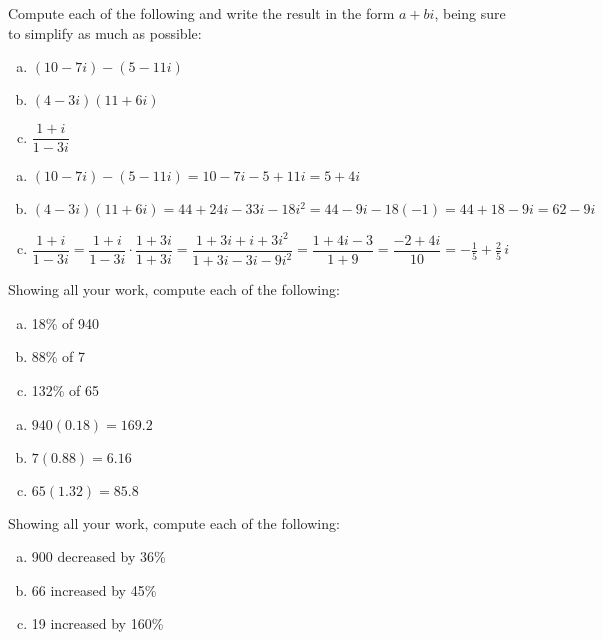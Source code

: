 \documentclass[12pt,letterpaper]{exam}
\begin{document}
\begin{questions}
\newpage
\question[10] Compute each of the following and write the result in the form $a + bi$, being sure to simplify as much as possible:
	\begin{enumerate}[(a)]
	\item $(10 - 7i) - (5 - 11i)$
	\item $(4 - 3i)(11 + 6i)$
	\item $\dfrac{1 + i}{1 - 3i}$
	\end{enumerate} \pspace

\sol
\begin{enumerate}[(a)]
\item $(10 - 7i) - (5 - 11i)= 10 - 7i - 5 + 11i= 5 + 4i$ \pspace

\item $(4 - 3i)(11 + 6i)= 44 + 24i - 33i - 18i^2= 44 - 9i - 18(-1)= 44 + 18 - 9i= 62 - 9i$ \pspace

\item $\dfrac{1 + i}{1 - 3i}= \dfrac{1 + i}{1 - 3i} \cdot \dfrac{1 + 3i}{1 + 3i}= \dfrac{1 + 3i + i + 3i^2}{1 + 3i - 3i - 9i^2}= \dfrac{1 + 4i - 3}{1 + 9}= \dfrac{-2 + 4i}{10}= -\tfrac{1}{5} + \tfrac{2}{5}\,i$
\end{enumerate}



\newpage
\question[10] Showing all your work, compute each of the following:
	\begin{enumerate}[(a)]
	\item 18\% of 940
	\item 88\% of 7
	\item 132\% of 65
	\end{enumerate} \pspace

\sol
\begin{enumerate}[(a)]
\item $940(0.18)= 169.2$ \pspace

\item $7(0.88)= 6.16$ \pspace

\item $65(1.32)= 85.8$ 
\end{enumerate}



\newpage
\question[10] Showing all your work, compute each of the following:
	\begin{enumerate}[(a)]
	\item 900 decreased by 36\%
	\item 66 increased by 45\%
	\item 19 increased by 160\%
	\end{enumerate} \pspace


\end{questions}
\end{document}
